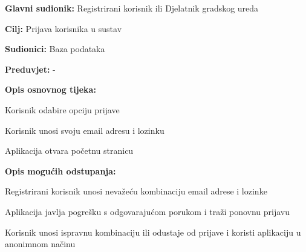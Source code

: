 				
				\noindent {}
				\begin{packed_item}
					
					\item \textbf{Glavni sudionik:} Registrirani korisnik ili Djelatnik gradskog ureda
					\item  \textbf{Cilj:} Prijava korisnika u sustav
					\item  \textbf{Sudionici:} Baza podataka
					\item  \textbf{Preduvjet:} -
					
					\item  \textbf{Opis osnovnog tijeka:}
					\item[] \begin{packed_enum}
						\item Korisnik odabire opciju prijave
						\item Korisnik unosi svoju email adresu i lozinku
						\item Aplikacija otvara početnu stranicu
					\end{packed_enum}
					
					\item  \textbf{Opis mogućih odstupanja:}
					\item[] \begin{packed_item}
						\item[2.a] Registrirani korisnik unosi nevažeću kombinaciju email adrese i lozinke
						\item[] \begin{packed_enum}
							\item Aplikacija javlja pogrešku s odgovarajućom porukom i traži ponovnu prijavu
							\item Korisnik unosi ispravnu kombinaciju ili odustaje od prijave i koristi aplikaciju u anonimnom načinu
						\end{packed_enum}
					\end{packed_item}
				\end{packed_item}
				
